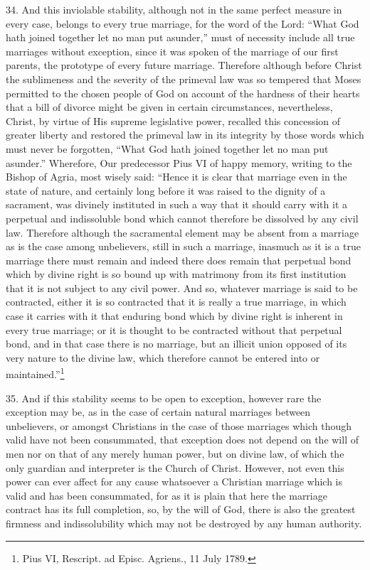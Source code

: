 \documentclass[12pt,a4paper]{book}
\begin{document}
34. And this inviolable stability, although not in the same perfect measure in every case, belongs to every true marriage, for the word of the Lord: ``What God hath joined together let no man put asunder,'' must of necessity include all true marriages without exception, since it was spoken of the marriage of our first parents, the prototype of every future marriage. Therefore although before Christ the sublimeness and the severity of the primeval law was so tempered that Moses permitted to the chosen people of God on account of the hardness of their hearts that a bill of divorce might be given in certain circumstances, nevertheless, Christ, by virtue of His supreme legislative power, recalled this concession of greater liberty and restored the primeval law in its integrity by those words which must never be forgotten, ``What God hath joined together let no man put asunder.'' Wherefore, Our predecessor Pius VI of happy memory, writing to the Bishop of Agria, most wisely said: ``Hence it is clear that marriage even in the state of nature, and certainly long before it was raised to the dignity of a sacrament, was divinely instituted in such a way that it should carry with it a perpetual and indissoluble bond which cannot therefore be dissolved by any civil law. Therefore although the sacramental element may be absent from a marriage as is the case among unbelievers, still in such a marriage, inasmuch as it is a true marriage there must remain and indeed there does remain that perpetual bond which by divine right is so bound up with matrimony from its first institution that it is not subject to any civil power. And so, whatever marriage is said to be contracted, either it is so contracted that it is really a true marriage, in which case it carries with it that enduring bond which by divine right is inherent in every true marriage; or it is thought to be contracted without that perpetual bond, and in that case there is no marriage, but an illicit union opposed of its very nature to the divine law, which therefore cannot be entered into or maintained.''\footnote{Pius VI, Rescript. ad Episc. Agriens., 11 July 1789.}

35. And if this stability seems to be open to exception, however rare the exception may be, as in the case of certain natural marriages between unbelievers, or amongst Christians in the case of those marriages which though valid have not been consummated, that exception does not depend on the will of men nor on that of any merely human power, but on divine law, of which the only guardian and interpreter is the Church of Christ. However, not even this power can ever affect for any cause whatsoever a Christian marriage which is valid and has been consummated, for as it is plain that here the marriage contract has its full completion, so, by the will of God, there is also the greatest firmness and indissolubility which may not be destroyed by any human authority.
\end{document}
